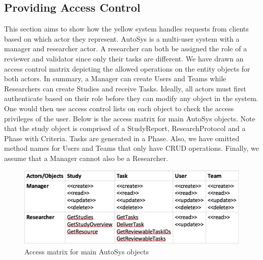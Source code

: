 \subsection{Providing Access Control}
This section aims to show how the yellow system handles requests from clients based on which actor they represent. AutoSys is a multi-user system with a manager and researcher actor. A researcher can both be assigned the role of a reviewer and validator since only their tasks are different. We have drawn an access control matrix depicting the allowed operations on the entity objects for both actors. In summary, a Manager can create Users and Teams while Researchers can create Studies and receive Tasks. Ideally, all actors must first authenticate based on their role before they can modify any object in the system. One would then use access control lists on each object to check the access privileges of the user. 
Below is the access matrix for main AutoSys objects. Note that the study object is comprised of a StudyReport, ResearchProtocol and a Phase with Criteria. Tasks are generated in a Phase. Also, we have omitted method names for Users and Teams that only have CRUD operations. Finally, we assume that a Manager cannot also be a Researcher. 

\begin{figure}[H]
	\includegraphics[width = \linewidth]{Images/accessmatrix}
	\caption{Access matrix for main AutoSys objects}
	\label{fig:accessmatrix}
\end{figure}

